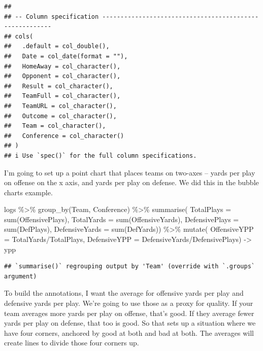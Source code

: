 \documentclass[
]{book}
\newenvironment{Shaded}{\begin{snugshade}}{\end{snugshade}}
\newcommand{\AttributeTok}[1]{\textcolor[rgb]{0.77,0.63,0.00}{#1}}
\newcommand{\FunctionTok}[1]{\textcolor[rgb]{0.00,0.00,0.00}{#1}}
\newcommand{\NormalTok}[1]{#1}
\newcommand{\OtherTok}[1]{\textcolor[rgb]{0.56,0.35,0.01}{#1}}
\newcommand{\SpecialCharTok}[1]{\textcolor[rgb]{0.00,0.00,0.00}{#1}}
\begin{document}
\begin{verbatim}
## 
## -- Column specification --------------------------------------------------------
## cols(
##   .default = col_double(),
##   Date = col_date(format = ""),
##   HomeAway = col_character(),
##   Opponent = col_character(),
##   Result = col_character(),
##   TeamFull = col_character(),
##   TeamURL = col_character(),
##   Outcome = col_character(),
##   Team = col_character(),
##   Conference = col_character()
## )
## i Use `spec()` for the full column specifications.
\end{verbatim}

I'm going to set up a point chart that places teams on two-axes -- yards per play on offense on the x axis, and yards per play on defense. We did this in the bubble charts example.

\begin{Shaded}
\begin{Highlighting}[]
\NormalTok{logs }\SpecialCharTok{\%\textgreater{}\%} 
  \FunctionTok{group\_by}\NormalTok{(Team, Conference) }\SpecialCharTok{\%\textgreater{}\%} 
  \FunctionTok{summarise}\NormalTok{(}
    \AttributeTok{TotalPlays =} \FunctionTok{sum}\NormalTok{(OffensivePlays), }
    \AttributeTok{TotalYards =} \FunctionTok{sum}\NormalTok{(OffensiveYards), }
    \AttributeTok{DefensivePlays =} \FunctionTok{sum}\NormalTok{(DefPlays), }
    \AttributeTok{DefensiveYards =} \FunctionTok{sum}\NormalTok{(DefYards)) }\SpecialCharTok{\%\textgreater{}\%} 
  \FunctionTok{mutate}\NormalTok{(}
    \AttributeTok{OffensiveYPP =}\NormalTok{ TotalYards}\SpecialCharTok{/}\NormalTok{TotalPlays, }
    \AttributeTok{DefensiveYPP =}\NormalTok{ DefensiveYards}\SpecialCharTok{/}\NormalTok{DefensivePlays) }\OtherTok{{-}\textgreater{}}\NormalTok{ ypp}
\end{Highlighting}
\end{Shaded}

\begin{verbatim}
## `summarise()` regrouping output by 'Team' (override with `.groups` argument)
\end{verbatim}

To build the annotations, I want the average for offensive yards per play and defensive yards per play. We're going to use those as a proxy for quality. If your team averages more yards per play on offense, that's good. If they average fewer yards per play on defense, that too is good. So that sets up a situation where we have four corners, anchored by good at both and bad at both. The averages will create lines to divide those four corners up.
\end{document}
